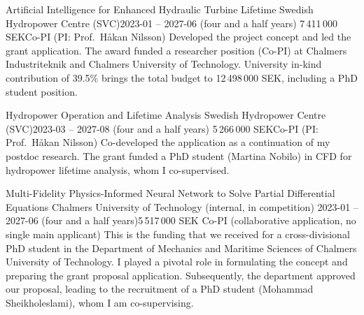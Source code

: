\grantentry
  {Artificial Intelligence for Enhanced Hydraulic Turbine Lifetime}
  {Swedish Hydropower Centre (SVC)}{2023-01 -- 2027-06 (four and a half years)}
  {7\,411\,000 SEK}{Co-PI (PI: Prof.\ Håkan Nilsson)}
  {Developed the project concept and led the grant application. The award funded
   a researcher position (Co-PI) at Chalmers Industriteknik and Chalmers
   University of Technology. University in-kind contribution of 39.5\% brings
   the total budget to 12\,498\,000 SEK, including a PhD student position.}

\grantentry
  {Hydropower Operation and Lifetime Analysis}
  {Swedish Hydropower Centre (SVC)}{2023-03 -- 2027-08 (four and a half years)}
  {5\,266\,000 SEK}{Co-PI (PI: Prof.\ Håkan Nilsson)}
  {Co-developed the application as a continuation of my postdoc research. The
   grant funded a PhD student (Martina Nobilo) in CFD for hydropower lifetime
   analysis, whom I co-supervised.}

\grantentry
  {Multi-Fidelity Physics-Informed Neural Network to Solve Partial Differential
   Equations}
  {Chalmers University of Technology (internal, in competition)}
  {2023-01 -- 2027-06 (four and a half years)}{5\,517\,000 SEK}
  {Co-PI (collaborative application, no single main applicant)}
  {This is the funding that we received for a cross-divisional PhD student in
   the Department of Mechanics and Maritime Sciences of Chalmers University of
   Technology. I played a pivotal role in formulating the concept and preparing
   the grant proposal application. Subsequently, the department approved our
   proposal, leading to the recruitment of a PhD student (Mohammad Sheikholeslami), whom I am
   co-supervising.}
